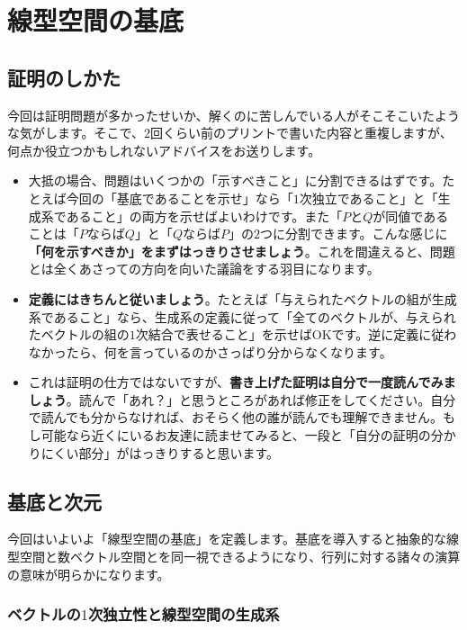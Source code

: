 \chapter{線型空間の基底}

\section{証明のしかた}

今回は証明問題が多かったせいか、解くのに苦しんでいる人がそこそこいたような気がします。そこで、$2$回くらい前のプリントで書いた内容と重複しますが、何点か役立つかもしれないアドバイスをお送りします。
\begin{itemize}
\item 大抵の場合、問題はいくつかの「示すべきこと」に分割できるはずです。たとえば今回の「基底であることを示せ」なら「$1$次独立であること」と「生成系であること」の両方を示せばよいわけです。また「$P$と$Q$が同値であることは「$P$ならば$Q$」と「$Q$ならば$P$」の$2$つに分割できます。こんな感じに\textbf{「何を示すべきか」をまずはっきりさせましょう}。これを間違えると、問題とは全くあさっての方向を向いた議論をする羽目になります。
\item \textbf{定義にはきちんと従いましょう}。たとえば「与えられたベクトルの組が生成系であること」なら、生成系の定義に従って「全てのベクトルが、与えられたベクトルの組の$1$次結合で表せること」を示せばOKです。逆に定義に従わなかったら、何を言っているのかさっぱり分からなくなります。
\item これは証明の仕方ではないですが、\textbf{書き上げた証明は自分で一度読んでみましょう}。読んで「あれ？」と思うところがあれば修正をしてください。自分で読んでも分からなければ、おそらく他の誰が読んでも理解できません。もし可能なら近くにいるお友達に読ませてみると、一段と「自分の証明の分かりにくい部分」がはっきりすると思います。
\end{itemize}

\section{基底と次元}

今回はいよいよ「線型空間の基底」を定義します。基底を導入すると抽象的な線型空間と数ベクトル空間とを同一視できるようになり、行列に対する諸々の演算の意味が明らかになります。

\subsection{ベクトルの$1$次独立性と線型空間の生成系}

